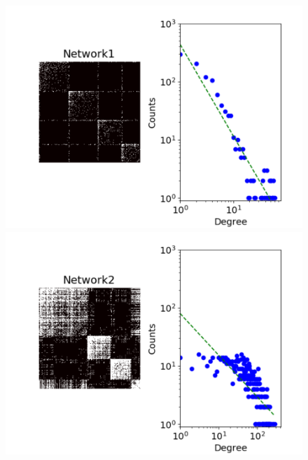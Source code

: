 \begin{figure}[ht!]
    \centering
        \begin{minipage}{0.4\textwidth}
            \includegraphics[width=\textwidth]{img/corpus/network1_dd}
        \end{minipage}
        \begin{minipage}{0.4\textwidth}
            \includegraphics[width=\textwidth]{img/corpus/network2_dd}
        \end{minipage}
        \begin{minipage}{0.4\textwidth}

\end{minipage}
\end{figure}
